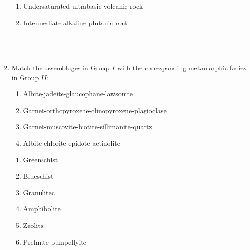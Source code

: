 \documentclass[journal,12pt,onecolumn,fleqn]{IEEEtran}
\theoremstyle{remark}
\theoremstyle{remark}
\begin{document}
\begin{enumerate}[label=Q.\arabic*.]
\begin{enumerate}
                \item Undersaturated ultrabasic volcanic rock
                \item Intermediate alkaline plutonic rock\\\\\\\\
            \end{enumerate}
\item Match the assemblages in Group $I$ with the corresponding metamorphic facies in Group $II$: \hfill{} \\
    
\begin{multicols}{2}
            \begin{enumerate}[label=(\Alph*),start=16]
                \item Albite-jadeite-glaucophane-lawsonite
                \item Garnet-orthopyroxene-clinopyroxene-plagioclase
                \item Garnet-muscovite-biotite-sillimanite-quartz
                \item Albite-chlorite-epidote-actinolite
            \end{enumerate}
            
            \columnbreak
            
            \begin{enumerate}[label=\arabic*.]
                \item Greenschist
                \item Blueschist
                \item Granulitec
                \item Amphibolite
                \item Zeolite
                \item Prehnite-pumpellyite
            \end{enumerate}         


        \end{multicols}
            \begin {enumerate}
\end{enumerate}
\end{enumerate}
\end{document}
